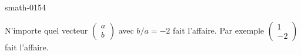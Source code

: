 
\begin{corrige}{smath-0154}

    N'importe quel vecteur \( \begin{pmatrix}
        a    \\ 
        b    
    \end{pmatrix}\) avec \( b/a=-2\) fait l'affaire. Par exemple \( \begin{pmatrix}
        1    \\ 
        -2    
    \end{pmatrix}\) fait l'affaire.

\end{corrige}
